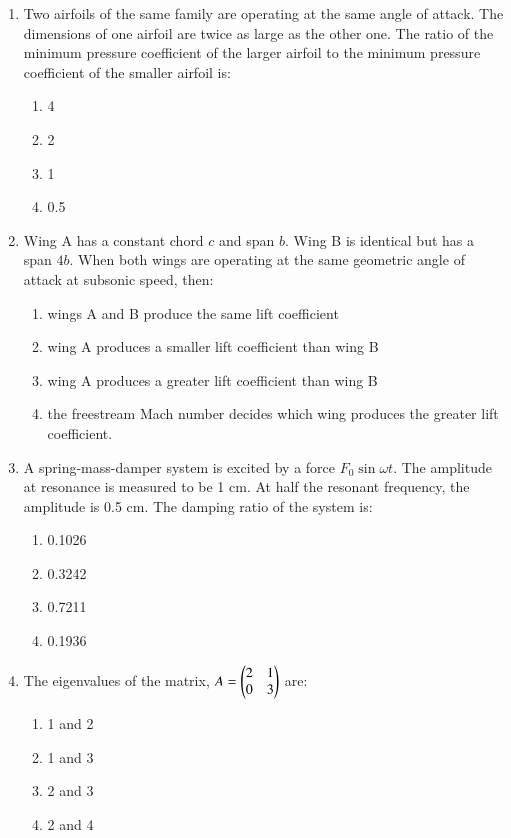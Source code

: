 \documentclass[journal]{IEEEtran}
\begin{document}
\begin{enumerate}[start=18]
\item  Two airfoils of the same family are operating at the same angle of attack. The dimensions of one airfoil are twice as large as the other one. The ratio of the minimum pressure coefficient of the larger airfoil to the minimum pressure coefficient of the smaller airfoil is: 
\begin{multicols}{4}
\begin{enumerate}
\item 4
\item 2
\item 1
\item 0.5
\end{enumerate}
\end{multicols}

\item  Wing A has a constant chord $c$ and span $b$. Wing B is identical but has a span $4b$. When both wings are operating at the same geometric angle of attack at subsonic speed, then:
\begin{enumerate}
\item wings A and B produce the same lift coefficient
\item wing A produces a smaller lift coefficient than wing B
\item wing A produces a greater lift coefficient than wing B
\item the freestream Mach number decides which wing produces the greater lift coefficient.
\end{enumerate}

\item  A spring-mass-damper system is excited by a force $F_0 \sin \omega t$. The amplitude at resonance is measured to be 1 cm. At half the resonant frequency, the amplitude is 0.5 cm. The damping ratio of the system is:
\begin{multicols}{4}
\begin{enumerate}
\item 0.1026
\item 0.3242
\item 0.7211
\item 0.1936
\end{enumerate}
\end{multicols}

\item  The eigenvalues of the matrix, 
$ A = \begin{pmatrix}2 & 1 \\0 & 3\end{pmatrix}$
are:
\begin{multicols}{4}
\begin{enumerate}
\item 1 and 2
\item 1 and 3
\item 2 and 3
\item 2 and 4
\end{enumerate}
\end{multicols}


\end{enumerate}
\end{document}
